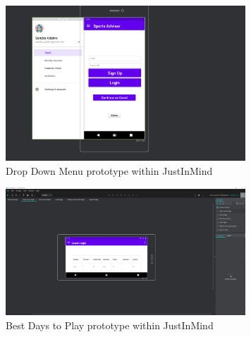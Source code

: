 \begin{figure}[H]
    \centering
    \includegraphics[width=9cm]{img/dropDownMenu.PNG}
    \caption{Drop Down Menu prototype within JustInMind}
    \label{fig:Drop Down Menu prototype within JustInMind}
\end{figure}

\begin{figure}[H]
    \centering
    \includegraphics[width=9cm]{img/BestDays.PNG}
    \caption{Best Days to Play prototype within JustInMind}
    \label{fig:Best Days to Play prototype within JustInMind}
\end{figure}

